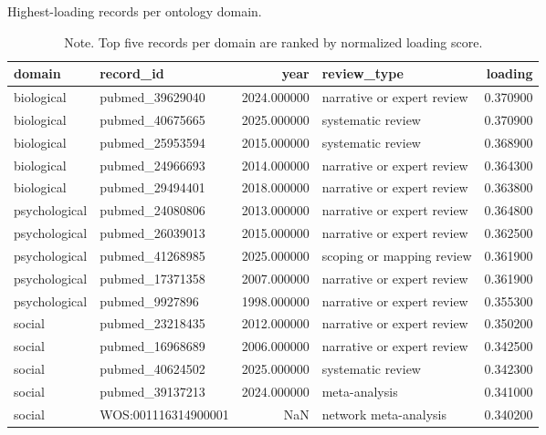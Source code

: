 \begin{table}[htbp]
\raggedright
\caption{Highest-loading records per ontology domain.}
\label{tab.semantic.top.records}
\begin{tabular}{llrlr}
\toprule
domain & record\_id & year & review\_type & loading \\
\midrule
biological & pubmed\_39629040 & 2024.000000 & narrative or expert review & 0.370900 \\
biological & pubmed\_40675665 & 2025.000000 & systematic review & 0.370900 \\
biological & pubmed\_25953594 & 2015.000000 & systematic review & 0.368900 \\
biological & pubmed\_24966693 & 2014.000000 & narrative or expert review & 0.364300 \\
biological & pubmed\_29494401 & 2018.000000 & narrative or expert review & 0.363800 \\
psychological & pubmed\_24080806 & 2013.000000 & narrative or expert review & 0.364800 \\
psychological & pubmed\_26039013 & 2015.000000 & narrative or expert review & 0.362500 \\
psychological & pubmed\_41268985 & 2025.000000 & scoping or mapping review & 0.361900 \\
psychological & pubmed\_17371358 & 2007.000000 & narrative or expert review & 0.361900 \\
psychological & pubmed\_9927896 & 1998.000000 & narrative or expert review & 0.355300 \\
social & pubmed\_23218435 & 2012.000000 & narrative or expert review & 0.350200 \\
social & pubmed\_16968689 & 2006.000000 & narrative or expert review & 0.342500 \\
social & pubmed\_40624502 & 2025.000000 & systematic review & 0.342300 \\
social & pubmed\_39137213 & 2024.000000 & meta-analysis & 0.341000 \\
social & WOS:001116314900001 & NaN & network meta-analysis & 0.340200 \\
\bottomrule
\end{tabular}

\caption*{Note. Top five records per domain are ranked by normalized loading score.}
\end{table}

